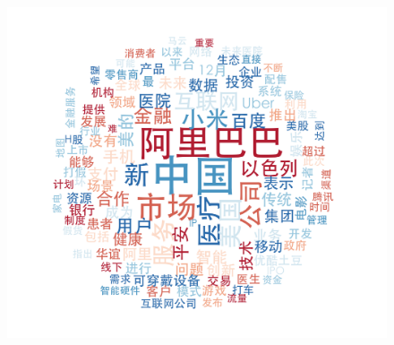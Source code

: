 \documentclass[11pt]{beamer}
\begin{document}
\begin{frame}
\begin{figure}
    \includegraphics[height=0.28\textheight]{plot/Dec-wordcloud}\\

\end{figure}
\end{frame}
\end{document}

